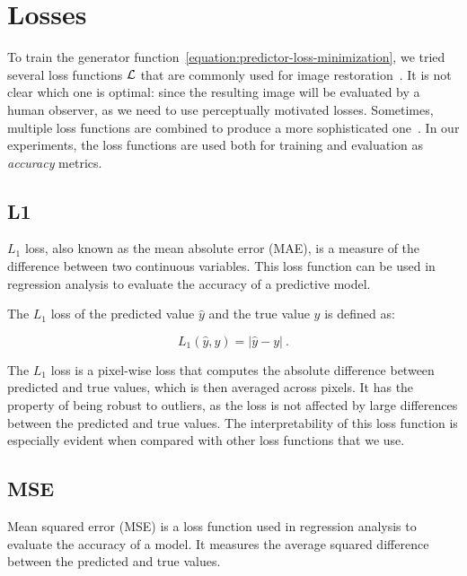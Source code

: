 \section{Losses}
\label{methods:losses}
To train the generator function~\ref{equation:predictor-loss-minimization}, we tried several loss functions ${\cal L}$ that are commonly used for image restoration~\citep{zhao2016loss}. It is not clear which one is optimal: since the resulting image will be evaluated by a human observer, as we need to use perceptually motivated losses. Sometimes, multiple loss functions are combined to produce a more sophisticated one~\citep{zhao2016loss}. In our experiments, the loss functions are used both for training and evaluation as \textit{accuracy} metrics.


\subsection{L1}
\label{methods:losses:L1}

$L_1$ loss, also known as the mean absolute error (MAE), is a measure of the difference between two continuous variables. This loss function can be used in regression analysis to evaluate the accuracy of a predictive model.

The $L_1$ loss of the predicted value $\hat{y}$ and the true value $y$ is defined as:

\begin{equation}
L_1(\hat{y},y) = |\hat{y} - y|\:.
\end{equation}

The $L_1$ loss is a pixel-wise loss that computes the absolute difference between predicted and true values, which is then averaged across pixels.  It has the property of being robust to outliers, as the loss is not affected by large differences between the predicted and true values. The interpretability of this loss function is especially evident when compared with other loss functions that we use.


\subsection{MSE}
\label{methods:losses:MSE}
Mean squared error (MSE) is a loss function used in regression analysis to evaluate the accuracy of a model. It measures the average squared difference between the predicted and true values.

